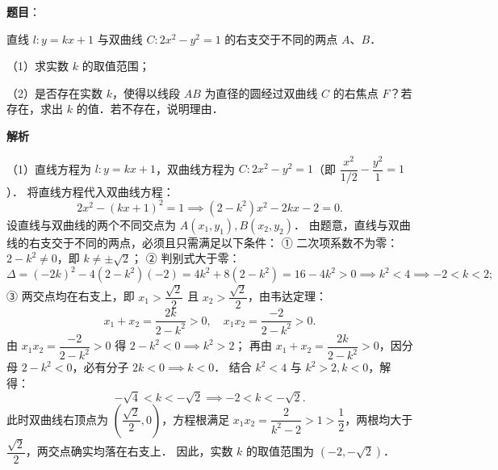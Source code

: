 \begin{answer}

\textbf{题目}：

直线 $l: y = kx + 1$ 与双曲线 $C: 2x^2 - y^2 = 1$ 的右支交于不同的两点 $A$、$B$．

（1）求实数 $k$ 的取值范围；

（2）是否存在实数 $k$，使得以线段 $AB$ 为直径的圆经过双曲线 $C$ 的右焦点 $F$？若存在，求出 $k$ 的值．若不存在，说明理由．

\textbf{解析}
\nopagebreak[4]
\begin{center}\end{center}
\nopagebreak[4]
（1）直线方程为 $l: y = kx + 1$，双曲线方程为 $C: 2x^2 - y^2 = 1$（即 $\dfrac{x^2}{1/2} - \dfrac{y^2}{1} = 1$）．
将直线方程代入双曲线方程：
\nopagebreak[4]
\[
2x^2 - (kx + 1)^2 = 1 \implies (2 - k^2)x^2 - 2kx - 2 = 0.
\]
设直线与双曲线的两个不同交点为 $A(x_1, y_1), B(x_2, y_2)$．
由题意，直线与双曲线的右支交于不同的两点，必须且只需满足以下条件：
① 二次项系数不为零：$2 - k^2 \neq 0$，即 $k \neq \pm \sqrt{2}$；
② 判别式大于零：
\nopagebreak[4]
\[
\Delta = (-2k)^2 - 4(2 - k^2)(-2) = 4k^2 + 8(2 - k^2) = 16 - 4k^2 > 0 \implies k^2 < 4 \implies -2 < k < 2;
\]
③ 两交点均在右支上，即 $x_1 > \dfrac{\sqrt{2}}{2}$ 且 $x_2 > \dfrac{\sqrt{2}}{2}$，由韦达定理：
\nopagebreak[4]
\[
x_1 + x_2 = \frac{2k}{2 - k^2} > 0, \quad x_1 x_2 = \frac{-2}{2 - k^2} > 0.
\]
   由 $x_1 x_2 = \dfrac{-2}{2 - k^2} > 0$ 得 $2 - k^2 < 0 \implies k^2 > 2$；
   再由 $x_1 + x_2 = \dfrac{2k}{2 - k^2} > 0$，因分母 $2 - k^2 < 0$，必有分子 $2k < 0 \implies k < 0$．
结合 $k^2 < 4$ 与 $k^2 > 2, k < 0$，解得：
\nopagebreak[4]
\[
-\sqrt{4} < k < -\sqrt{2} \implies -2 < k < -\sqrt{2}.
\]
此时双曲线右顶点为 $\left(\dfrac{\sqrt{2}}{2}, 0\right)$，方程根满足 $x_1 x_2 = \dfrac{2}{k^2 - 2} > 1 > \dfrac{1}{2}$，两根均大于 $\dfrac{\sqrt{2}}{2}$，两交点确实均落在右支上．
因此，实数 $k$ 的取值范围为 $(-2, -\sqrt{2})$．


\end{answer}
